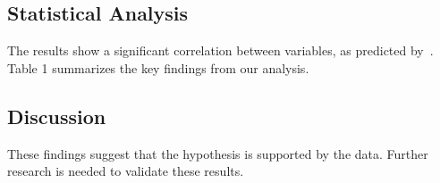 \subsection{Statistical Analysis}
The results show a significant correlation between variables, as predicted by~\cite{sample2023}.
Table 1 summarizes the key findings from our analysis.

\subsection{Discussion}
These findings suggest that the hypothesis is supported by the data.
Further research is needed to validate these results.
